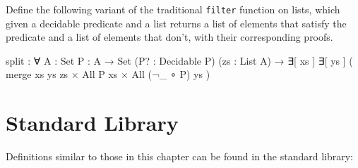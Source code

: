 Define the following variant of the traditional \texttt{filter} function
on lists, which given a decidable predicate and a list returns a list of
elements that satisfy the predicate and a list of elements that don't,
with their corresponding proofs.

\begin{myDisplay}
split : ∀ {A : Set} {P : A → Set} (P? : Decidable P) (zs : List A)
  → ∃[ xs ] ∃[ ys ] ( merge xs ys zs × All P xs × All (¬_ ∘ P) ys )
\end{myDisplay}

\begin{fence}
\begin{code}%
\>[0]\<%
\end{code}
\end{fence}

\hypertarget{standard-library}{%
\section{Standard Library}\label{standard-library}}

Definitions similar to those in this chapter can be found in the
standard library:

